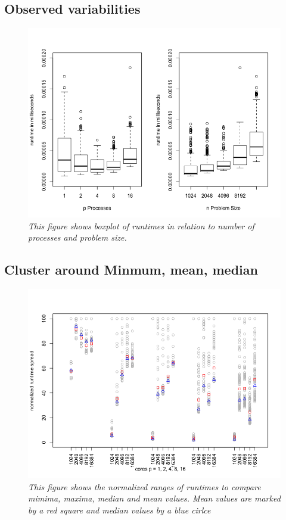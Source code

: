 \documentclass[a4paper,11pt,twoside]{article}
\begin{document}
\subsection{Observed variabilities}
\begin{figure}
  \centering
    \includegraphics[width=1\textwidth]{boxplot.png}
    \caption{\textit{This figure shows boxplot of runtimes in relation to number of processes and problem size.}}
    \label{fig:boxplot}
\end{figure}


\subsection{Cluster around Minmum, mean, median}
\begin{figure}
  \centering
    \includegraphics[width=1\textwidth]{spread.png}
    \caption{\textit{This figure shows the normalized ranges of runtimes to compare mimima, maxima, median and mean values. Mean values are marked by a red square and median values by a blue cirlce}}
    \label{fig:spread}
\end{figure}
\end{document}
